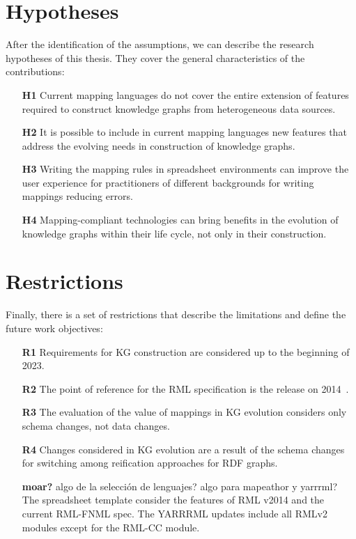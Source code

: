 \section{Hypotheses}
\label{sec:chp3-hypotheses}

After the identification of the assumptions, we can describe the research hypotheses  of this thesis. They cover the general characteristics of the contributions:

\begin{enumerate}
    \item[\textbf{H1}] Current mapping languages do not cover the entire extension of features required to construct knowledge graphs from heterogeneous data sources.
    \item[\textbf{H2}] It is possible to include in current mapping languages new features that address the evolving needs in construction of knowledge graphs.
    \item[\textbf{H3}] Writing the mapping rules in spreadsheet environments can improve the user experience for practitioners of different backgrounds for writing mappings reducing errors. 
    \item[\textbf{H4}] Mapping-compliant technologies can bring benefits in the evolution of knowledge graphs within their life cycle, not only in their construction.
\end{enumerate}


\section{Restrictions}
\label{sec:chp3-restrictions}

Finally, there is a set of restrictions that describe the limitations and define the future work objectives:

\begin{enumerate}
    \item[\textbf{R1}] Requirements for KG construction are considered up to the beginning of 2023.
    \item[\textbf{R2}] The point of reference for the RML specification is the release on 2014~\cite{Dimou2014rml}.
    \item[\textbf{R3}] The evaluation of the value of mappings in KG evolution considers only schema changes, not data changes.
    \item[\textbf{R4}] Changes considered in KG evolution are a result of the schema changes for switching among reification approaches for RDF graphs.
    \item[\textbf{moar?}] algo de la selección de lenguajes? algo para mapeathor y yarrrml? The spreadsheet template consider the features of RML v2014 and the current RML-FNML spec. The YARRRML updates include all RMLv2 modules except for the RML-CC module.
\end{enumerate}


